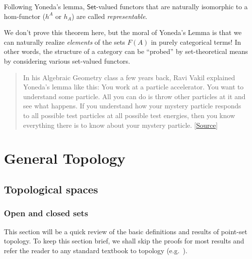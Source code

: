\begin{defn}
    Following Yoneda's lemma, $\mathsf{Set}$-valued functors that are naturally isomorphic to a hom-functor ($h^A$ or $h_A$) are called \emph{representable}.
\end{defn}
\begin{rem}
We don't prove this theorem here, but the moral of Yoneda's Lemma
is that we can naturally realize \emph{elements} of the sets
$F(A)$ in purely categorical terms! In other words, the structure of a category can be ``probed'' by set-theoretical means by considering various set-valued functors.
\end{rem}
\begin{quote}
\small In his Algebraic Geometry class a few years back, Ravi Vakil
explained Yoneda's lemma like this: You work at a particle accelerator.
You want to understand some particle. All you can do is throw other
particles at it and see what happens. If you understand how your mystery
particle responds to all possible test particles at all possible test
energies, then you know everything there is to know about your mystery
particle. {[}\href{https://mathoverflow.net/a/3223/22773}{Source}{]}
\end{quote}

\newpage
\section{General Topology}

\subsection{Topological spaces}

\subsubsection{Open and closed sets}

This section will be a quick review of the basic definitions and results of point-set topology. To keep this section brief, we shall skip the proofs for most results and refer the reader to any standard textbook to topology (e.g.\ \cite{Munk}).

